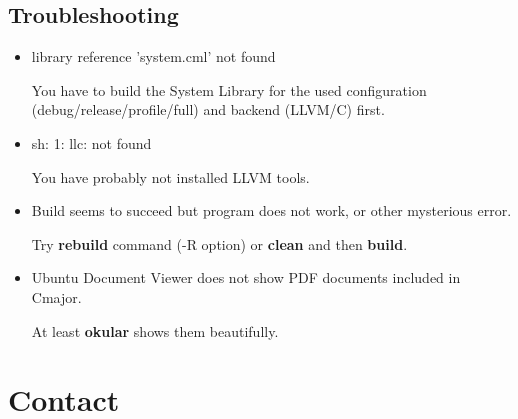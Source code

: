 \documentclass[oneside, a4paper, 11pt]{article}
\begin{document}
\subsection{Troubleshooting}

\begin{itemize}

\item
library reference 'system.cml' not found

You have to build the System Library for the used configuration (debug/release/profile/full) and backend (LLVM/C) first.

\item
sh: 1: llc: not found

You have probably not installed LLVM tools.

\item
Build seems to succeed but program does not work, or other mysterious error.

Try \textbf{rebuild} command (-R option) or \textbf{clean} and then \textbf{build}.

\item
Ubuntu Document Viewer does not show PDF documents included in Cmajor.

At least \textbf{okular} shows them beautifully.

\end{itemize}

\section{Contact}

\end{document}
